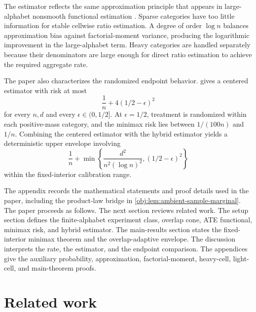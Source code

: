 \documentclass[11pt]{article}
\begin{document}
The estimator reflects the same approximation principle that appears in large-alphabet nonsmooth functional estimation \citep{Paninski2003,JiaoVenkatHanWeissman2015,WuYang2016,HanJiaoWeissman2020}. Sparse categories have too little information for stable cellwise ratio estimation. A degree of order \(\log n\) balances approximation bias against factorial-moment variance, producing the logarithmic improvement in the large-alphabet term. Heavy categories are handled separately because their denominators are large enough for direct ratio estimation to achieve the required aggregate rate.

The paper also characterizes the randomized endpoint behavior.  gives a centered estimator with risk at most
\[
\frac1n+4(1/2-\epsilon)^2
\]
for every \(n,d\) and every \(\epsilon\in(0,1/2]\). At \(\epsilon=1/2\), treatment is randomized within each positive-mass category, and the minimax risk lies between \(1/(100n)\) and \(1/n\). Combining the centered estimator with the hybrid estimator yields a deterministic upper envelope involving
\[
\frac1n+
\min\left\{
\frac{d^2}{n^2(\log n)^2},(1/2-\epsilon)^2
\right\}
\]
within the fixed-interior calibration range.

The appendix records the mathematical statements and proof details used in the paper, including the product-law bridge in \cref{obj:lem:ambient-sample-marginal}. The paper proceeds as follows. The next section reviews related work. The setup section defines the finite-alphabet experiment class, overlap cone, ATE functional, minimax risk, and hybrid estimator. The main-results section states the fixed-interior minimax theorem and the overlap-adaptive envelope. The discussion interprets the rate, the estimator, and the endpoint comparison. The appendices give the auxiliary probability, approximation, factorial-moment, heavy-cell, light-cell, and main-theorem proofs.


\section{Related work}
\end{document}
